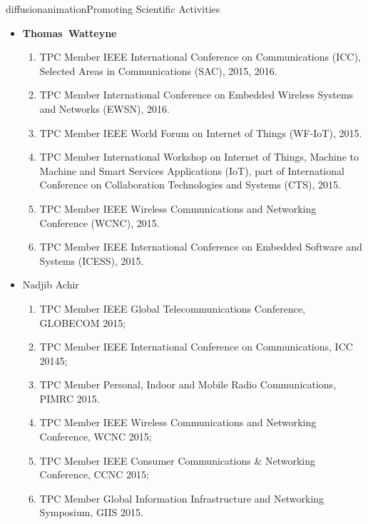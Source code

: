 \documentclass{ra2016}
\newcommand{\thomas}  {\textbf{Thomas~Watteyne}}
\begin{document}
\begin{module}{diffusion}{animation}{Promoting Scientific Activities}
\begin{itemize}
\begin{enumerate}
            \item TPC Member RAWSN 2015, 3rd International Workshop on RFID And Adaptive Wireless Sensor Networks, May 2015.
            \item TPC Member RTNS 2015, 23th International Conference on Real-Time and Network Systems, November 2015.
            \item TPC Member WINCOM 2015, 1st International Conference on Wireless Networks and Mobile Communications, October 2015.
        \end{enumerate}
    \item \thomas
        \begin{enumerate}
            \item TPC Member IEEE International Conference on Communications (ICC), Selected Areas in Communications (SAC), 2015, 2016.
            \item TPC Member International Conference on Embedded Wireless Systems and Networks (EWSN), 2016.
            \item TPC Member IEEE World Forum on Internet of Things (WF-IoT), 2015.
            \item TPC Member International Workshop on Internet of Things, Machine to Machine and Smart Services Applications (IoT), part of International Conference on  Collaboration Technologies and Systems (CTS), 2015.
            \item TPC Member IEEE Wireless Communications and Networking Conference (WCNC), 2015.
            \item TPC Member IEEE International Conference on Embedded Software and Systems (ICESS), 2015.
        \end{enumerate}
    \item Nadjib Achir
        \begin{enumerate}
            \item TPC Member IEEE Global Telecommunications Conference, GLOBECOM 2015;
            \item TPC Member IEEE International Conference on Communications, ICC 20145;
            \item TPC Member Personal, Indoor and Mobile Radio Communications, PIMRC 2015.
            \item TPC Member IEEE Wireless Communications and Networking Conference, WCNC 2015;
            \item TPC Member IEEE Consumer Communications \& Networking Conference, CCNC 2015;
            \item TPC Member Global Information Infrastructure and Networking Symposium, GIIS 2015.                   

\end{enumerate}
\end{itemize}
\end{module}
\end{document}
